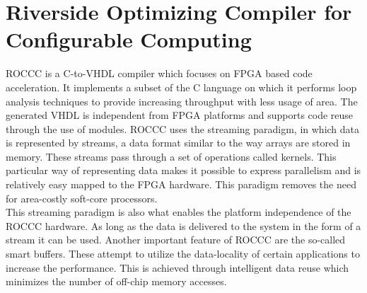 \section{Riverside Optimizing Compiler for Configurable Computing} 
ROCCC is a C-to-VHDL compiler which focuses on FPGA based code acceleration. It implements a subset of the C language on which it performs loop analysis techniques to provide increasing throughput with less usage of area\cite{martin_high-level_2009}. The generated VHDL is independent from FPGA platforms and supports code reuse through the use of modules. 
ROCCC uses the streaming paradigm, in which data is represented by streams, a data format similar to the way arrays are stored in memory. These streams pass through a set of operations called kernels. This particular way of representing data makes it possible to express parallelism and is relatively easy mapped to the FPGA hardware. This paradigm removes the need for area-costly soft-core processors\cite{buyukkurt_impact_2006}.\\
This streaming paradigm is also what enables the platform independence of the ROCCC hardware. As long as the data is delivered to the system in the form of a stream it can be used.
Another important feature of ROCCC are the so-called smart buffers. These attempt to utilize the data-locality of certain applications to increase the performance. This is achieved through intelligent data reuse which minimizes the number of off-chip memory accesses. 

